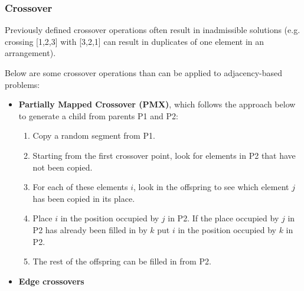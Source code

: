 \documentclass[12pt,titlepage]{article}
\begin{document}
      \subsubsection{Crossover}
        Previously defined crossover operations often result in inadmissible solutions (e.g. crossing [1,2,3] with [3,2,1] can result in duplicates of one element in an arrangement).

        Below are some crossover operations than can be applied to adjacency-based problems:
        \begin{itemize}
          \item \textbf{Partially Mapped Crossover (PMX)}, which follows the approach below to generate a child from parents P1 and P2:
            \begin{enumerate}
              \item Copy a random segment from P1.
              \item Starting from the first crossover point, look for elements in P2 that have not been copied.
              \item For each of these elements $i$, look in the offspring to see which element $j$ has been copied in its place.
              \item Place $i$ in the position occupied by $j$ in P2. If the place occupied by $j$ in P2 has already been filled in by $k$ put $i$ in the position occupied by $k$ in P2.
              \item The rest of the offspring can be filled in from P2.
            \end{enumerate}
          \item \textbf{Edge crossovers}
        \end{itemize}
\end{document}
